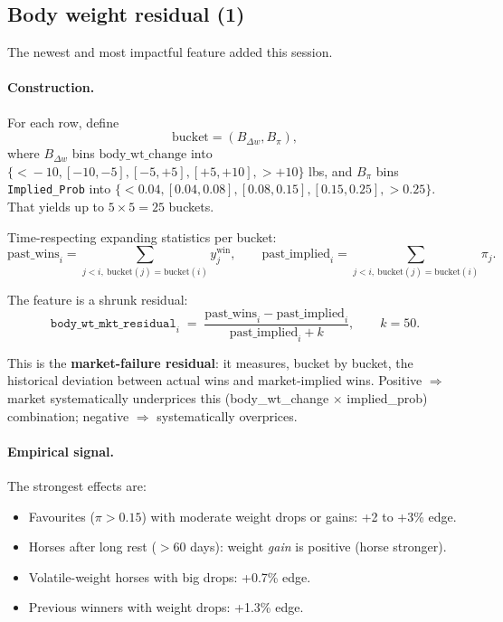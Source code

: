 \documentclass[11pt]{article}
\begin{document}
\subsection{Body weight residual (1)}
\label{sec:body_wt_residual}

The newest and most impactful feature added this session.

\paragraph{Construction.} For each row, define
\[
\text{bucket} = (B_{\Delta w}, B_\pi),
\]
where $B_{\Delta w}$ bins $\text{body\_wt\_change}$ into
$\{<\!-10, [-10,-5], [-5,+5], [+5,+10], >+10\}$ lbs, and $B_\pi$ bins
\texttt{Implied\_Prob} into $\{<0.04, [0.04,0.08], [0.08,0.15], [0.15,0.25], >0.25\}$.
That yields up to $5\times 5=25$ buckets.

Time-respecting expanding statistics per bucket:
\[
\text{past\_wins}_i = \sum_{j<i,\ \text{bucket}(j)=\text{bucket}(i)} y_j^{\text{win}},
\qquad
\text{past\_implied}_i = \sum_{j<i,\ \text{bucket}(j)=\text{bucket}(i)} \pi_j.
\]

The feature is a shrunk residual:
\[
\texttt{body\_wt\_mkt\_residual}_i \;=\;
\frac{\text{past\_wins}_i - \text{past\_implied}_i}{\text{past\_implied}_i + k},
\qquad k=50.
\]

This is the \textbf{market-failure residual}: it measures, bucket by bucket,
the historical deviation between actual wins and market-implied wins.
Positive $\Rightarrow$ market systematically underprices this
(body\_wt\_change $\times$ implied\_prob) combination; negative $\Rightarrow$
systematically overprices.

\paragraph{Empirical signal.} The strongest effects are:
\begin{itemize}\item Favourites ($\pi > 0.15$) with moderate weight drops or gains:
      +2 to +3\% edge.
\item Horses after long rest ($>$60 days): weight \emph{gain} is positive
      (horse stronger).
\item Volatile-weight horses with big drops: +0.7\% edge.
\item Previous winners with weight drops: +1.3\% edge.
\end{itemize}
\end{document}
